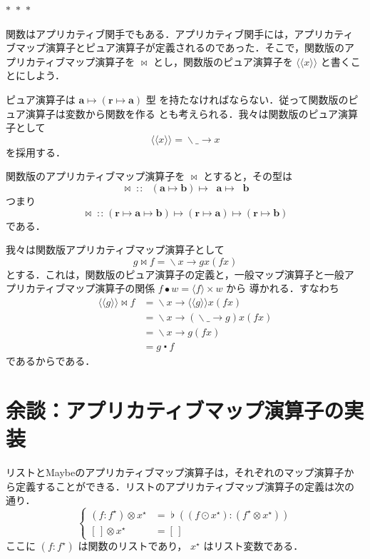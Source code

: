 \documentclass[a5paper,twoside,fleqn]{jsbook}
\newcommand{\Langle}{\langle\!\langle}
\newcommand{\Rangle}{\rangle\!\rangle}
\newcommand{\separator}{\begin{center}$*$~$*$~$*$\end{center}}
\newcommand{\mEmptyList}{{[\,]}}
\newcommand{\mAnyParam}{\_}
\DeclareMathOperator{\mAppMap}{\times}
\DeclareMathOperator{\mAppMapFunc}{\bowtie}
\DeclareMathOperator{\mAppMapList}{\otimes}
\DeclareMathOperator{\mComp}{\centerdot}
\DeclareMathOperator{\mConcat}{\flat}
\DeclareMathOperator{\mIn}{{:\!:}}
\DeclareMathOperator{\mLambda}{\backslash}
\DeclareMathOperator{\mLambdaArrow}{\rightarrow}
\DeclareMathOperator{\mMap}{\bullet}
\DeclareMathOperator{\mMapList}{\odot}
\DeclareMathOperator{\mMapsTo}{\mapsto}
\newcommand{\mType}[1]{\mathbf{#1}}
\newcommand{\mTypeConstructor}[1]{\textit{#1}}
\newcommand{\mFuncTypeConstructor}[1]{\mathop{\mTypeConstructor{Func}_\mType{#1}}}
\newcommand{\mFuncWith}[1]{\Langle#1\Rangle}
\newcommand{\mPureWith}[1]{\langle#1\rangle}
\newcommand{\mList}[1]{{#1}^\mathrm{\star}}
\newcommand{\mLambdaExp}[2]{\mLambda{#1}\mLambdaArrow{#2}}
\newcommand{\mProj}[2]{#1\mMapsTo#2}
\begin{document}
\separator

関数はアプリカティブ関手でもある．アプリカティブ関手には，アプリカティ
ブマップ演算子とピュア演算子が定義されるのであった．そこで，関数版のア
プリカティブマップ演算子を $\mAppMapFunc$ とし，関数版のピュア演算子を
$\mFuncWith{x}$ と書くことにしよう．

ピュア演算子は $\mProj{\mType{a}}{(\mProj{\mType{r}}{\mType{a}})}$ 型
を持たなければならない．従って関数版のピュア演算子は変数から関数を作る
とも考えられる．我々は関数版のピュア演算子として
\begin{equation}
\mFuncWith{x}=\mLambdaExp{\mAnyParam}{x}
\end{equation}
を採用する．

関数版のアプリカティブマップ演算子を $\mAppMapFunc$ とすると，その型は
\begin{equation}
\mAppMapFunc
\mIn
\mProj{
  \mProj{
    \mFuncTypeConstructor{r}(\mProj{\mType{a}}{\mType{b}})
  }
  {
    \mFuncTypeConstructor{r}\mType{a}
  }
}
{
  \mFuncTypeConstructor{r}\mType{b}
}
\end{equation}
つまり
\begin{equation}
\mAppMapFunc
\mIn{}
\mProj{
  \mProj{
    (\mProj{\mType{r}}{\mProj{\mType{a}}{\mType{b}}})
  }
  {
    (\mProj{\mType{r}}{\mType{a}})
  }
}
{
  (\mProj{\mType{r}}{\mType{b}})
}
\end{equation}
である．

我々は関数版アプリカティブマップ演算子として
\begin{equation}
g\mAppMapFunc f=\mLambdaExp{x}{gx(fx)}
\end{equation}
とする．これは，関数版のピュア演算子の定義と，一般マップ演算子と一般ア
プリカティブマップ演算子の関係 $f\mMap w=\mPureWith{f}\mAppMap w$ から
導かれる．すなわち
\begin{align}
\mFuncWith{g}\mAppMapFunc f
&=\mLambdaExp{x}{\mFuncWith{g}x(fx)}\\
&=\mLambdaExp{x}{(\mLambdaExp{\mAnyParam}{g})x(fx)}\\
&=\mLambdaExp{x}{g(fx)}\\
&=g\mComp f
\end{align}
であるからである．

\section{余談：アプリカティブマップ演算子の実装}

リストとMaybeのアプリカティブマップ演算子は，それぞれのマップ演算子か
ら定義することができる．リストのアプリカティブマップ演算子の定義は次の
通り．
\begin{equation}
\left\{
\begin{aligned}
(f:\mList{f})\mAppMapList\mList{x}&=\mConcat{}((f\mMapList\mList{x}):(\mList{f}\mAppMapList\mList{x}))\\
\mEmptyList\mAppMapList\mList{x}&=\mEmptyList
\end{aligned}
\right.
\end{equation}
ここに $(f:\mList{f})$ は関数のリストであり， $\mList{x}$ はリスト変数である．
\end{document}
